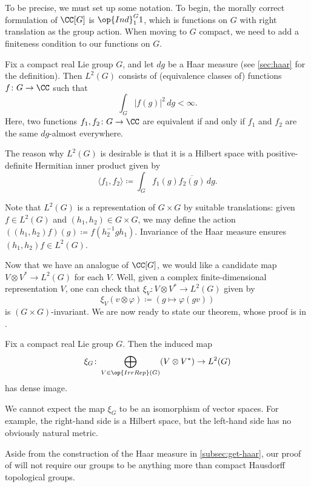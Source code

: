\documentclass[notes.tex]{subfiles}
\begin{document}
To be precise, we must set up some notation. To begin, the morally correct formulation of $\CC[G]$ is $\op{Ind}_1^G1$, which is functions on $G$ with right translation as the group action. When moving to $G$ compact, we need to add a finiteness condition to our functions on $G$.
\begin{definition}
	Fix a compact real Lie group $G$, and let $dg$ be a Haar measure (see \cref{sec:haar} for the definition). Then $L^2(G)$ consists of (equivalence classes of) functions $f\colon G\to\CC$ such that
	\[\int_G\left|f(g)\right|^2\,dg<\infty.\]
	Here, two functions $f_1,f_2\colon G\to\CC$ are equivalent if and only if $f_1$ and $f_2$ are the same $dg$-almost everywhere.
\end{definition}
\begin{remark}
	The reason why $L^2(G)$ is desirable is that it is a Hilbert space with positive-definite Hermitian inner product given by
	\[\langle f_1,f_2\rangle\coloneqq\int_Gf_1(g)\overline{f_2(g)}\,dg.\]
\end{remark}
\begin{remark} \label{rem:g-g-action-on-l2}
	Note that $L^2(G)$ is a representation of $G\times G$ by suitable translations: given $f\in L^2(G)$ and $(h_1,h_2)\in G\times G$, we may define the action $((h_1,h_2)f)(g)\coloneqq f\left(h_2^{-1}gh_1\right)$. Invariance of the Haar measure ensures $(h_1,h_2)f\in L^2(G)$.
\end{remark}
Now that we have an analogue of $\CC[G]$, we would like a candidate map $V\otimes V^*\to L^2(G)$ for each $V$. Well, given a complex finite-dimensional representation $V$, one can check that $\xi_V\colon V\otimes V^*\to L^2(G)$ given by
\[\xi_V(v\otimes\varphi)\coloneqq(g\mapsto\varphi(gv))\]
is $(G\times G)$-invariant.
We are now ready to state our theorem, whose proof is in .
\begin{theorem} \label{thm:pw}
	Fix a compact real Lie group $G$. Then the induced map
	\[\xi_G\colon\bigoplus_{V\in\op{IrrRep}(G)}(V\otimes V^*)\to L^2(G)\]
	has dense image.
\end{theorem}
\begin{remark}
	We cannot expect the map $\xi_G$ to be an isomorphism of vector spaces. For example, the right-hand side is a Hilbert space, but the left-hand side has no obviously natural metric.
\end{remark}
\begin{remark}
	Aside from the construction of the Haar measure in \cref{subsec:get-haar}, our proof of  will not require our groups to be anything more than compact Hausdorff topological groups.
\end{remark}
\end{document}

